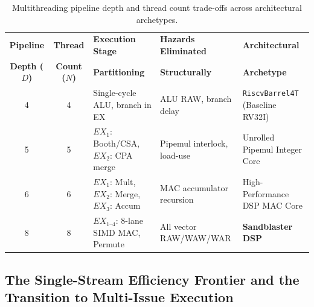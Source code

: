 \begin{table}[H]
\centering
\small
\begin{tabular}{|c|c|l|l|l|}
\hline
\textbf{Pipeline} & \textbf{Thread} & \textbf{Execution Stage} & \textbf{Hazards Eliminated} & \textbf{Architectural} \\
\textbf{Depth ($D$)} & \textbf{Count ($N$)} & \textbf{Partitioning} & \textbf{Structurally} & \textbf{Archetype} \\ \hline\hline
4 & 4 & Single-cycle ALU, branch in EX & ALU RAW, branch delay & \texttt{RiscvBarrel4T} (Baseline RV32I) \\ \hline
5 & 5 & $EX_1$: Booth/CSA, $EX_2$: CPA merge & Pipemul interlock, load-use & Unrolled Pipemul Integer Core \\ \hline
6 & 6 & $EX_1$: Mult, $EX_2$: Merge, $EX_3$: Accum & MAC accumulator recursion & High-Performance DSP MAC Core \\ \hline
8 & 8 & $EX_{1\text{--}4}$: 8-lane SIMD MAC, Permute & All vector RAW/WAW/WAR & \textbf{Sandblaster DSP} \cite{glossner2003sandblaster} \\ \hline
\end{tabular}
\caption{Multithreading pipeline depth and thread count trade-offs across architectural archetypes.}
\label{tab:mt_pipeline_thread_tradeoffs}
\end{table}


\subsection{The Single-Stream Efficiency Frontier and the Transition to Multi-Issue Execution}\label{subsec:single_stream_frontier}

